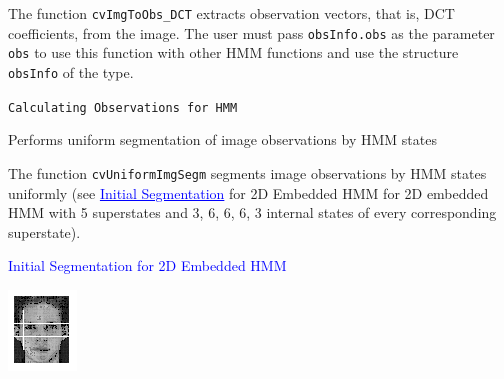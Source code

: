 \begin{description}
\end{description}

The function \texttt{cvImgToObs\_DCT} extracts observation vectors, that is, DCT coefficients, from the image. The user must pass \texttt{obsInfo.obs} as the parameter \texttt{obs} to use this function with other HMM functions and use the structure \texttt{obsInfo} of the  type.

\texttt{Calculating Observations for HMM}



Performs uniform segmentation of image observations by HMM states


\begin{description}
\end{description}

The function \texttt{cvUniformImgSegm} segments image observations by HMM states uniformly (see \textcolor{blue}{\underline{Initial Segmentation}} for 2D Embedded HMM for 2D embedded HMM with 5 superstates and 3, 6, 6, 6, 3 internal states of every corresponding superstate).

\textcolor{blue}{Initial Segmentation for 2D Embedded HMM}

\includegraphics{pics/face.png}

